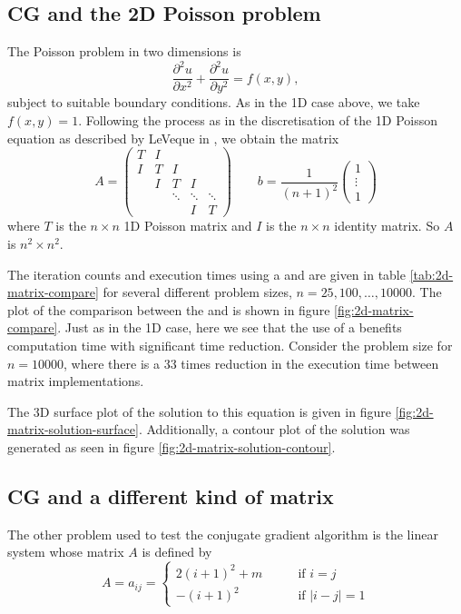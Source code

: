 \subsection{CG and the 2D Poisson problem}

The Poisson problem in two dimensions is
\[
	\frac{\partial^2 u}{\partial x^2} + \frac{\partial^2 u}{\partial y^2} = f(x,y),
\]
subject to suitable boundary conditions. 
As in the 1D case above, we take $f(x,y)=1$.
Following the process as in the discretisation of the 1D Poisson equation as described by LeVeque in \cite{finitediff}, we obtain the matrix
\[
A = \begin{pmatrix}
	T & I & & & \\
    I & T & I && \\
    & I & T & I & \\
    && \ddots & \ddots & \ddots \\
    &&& I & T
\end{pmatrix}
\qquad
b = \frac{1}{(n+1)^2}\begin{pmatrix}
	1 \\ \vdots \\ 1
\end{pmatrix}
\]
where $T$ is the $n\times n$ 1D Poisson matrix and $I$ is the $n\times n$ identity matrix.
So $A$ is $n^2\times n^2$.

The iteration counts and execution times using a  and  are given in table \ref{tab:2d-matrix-compare} for several different problem sizes, $n=25,100,\ldots,10000$. 
The plot of the comparison between the  and  is shown in figure \ref{fig:2d-matrix-compare}.
Just as in the 1D case, here we see that the use of a  benefits computation time with significant time reduction.
Consider the problem size for $n=10000$, where there is a 33 times reduction in the execution time between matrix implementations.

The 3D surface plot of the solution to this equation is given in figure \ref{fig:2d-matrix-solution-surface}.
Additionally, a contour plot of the solution was generated as seen in figure \ref{fig:2d-matrix-solution-contour}.


\subsection{CG and a different kind of matrix}
\label{sec:mat2}

The other problem used to test the conjugate gradient algorithm is the linear system whose matrix $A$ is defined by
\[
	A = a_{ij} = \begin{cases}
		2(i+1)^2 + m \qquad & \text{if } i=j \\
        -(i+1)^2 	 \qquad & \text{if } |i-j|=1
	\end{cases}
\]

